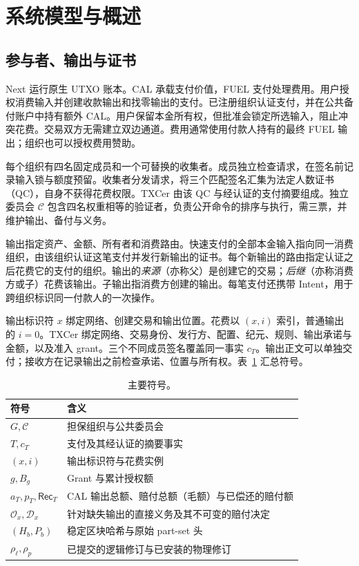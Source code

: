\section{系统模型与概述}
\label{sec:model}

\subsection{参与者、输出与证书}
\label{sec:model-participants}
\label{sec:model-certificates}

Next 运行原生 UTXO 账本。CAL 承载支付价值，FUEL 支付处理费用。用户授权消费输入并创建收款输出和找零输出的支付。已注册组织认证支付，并在公共备付账户中持有额外 CAL。用户保留本金所有权，但批准会锁定所选输入，阻止冲突花费。交易双方无需建立双边通道。费用通常使用付款人持有的最终 FUEL 输出；组织也可以授权费用赞助。

每个组织有四名固定成员和一个可替换的收集者。成员独立检查请求，在签名前记录输入锁与额度预留。收集者分发请求，将三个匹配签名汇集为法定人数证书（QC），自身不获得花费权限。TXCer 由该 QC 与经认证的支付摘要组成。独立委员会 $\mathcal C$ 包含四名权重相等的验证者，负责公开命令的排序与执行，需三票，并维护输出、备付与义务。

输出指定资产、金额、所有者和消费路由。快速支付的全部本金输入指向同一消费组织，由该组织认证这笔支付并发行新输出的证书。每个新输出的路由指定认证之后花费它的支付的组织。输出的\emph{来源}（亦称父）是创建它的交易；\emph{后继}（亦称消费方或子）花费该输出。子输出指消费方创建的输出。每笔支付还携带 Intent，用于跨组织标识同一付款人的一次操作。

输出标识符 $x$ 绑定网络、创建交易和输出位置。花费以 $(x,i)$ 索引，普通输出的 $i=0$。TXCer 绑定网络、交易身份、发行方、配置、纪元、规则、输出承诺与金额，以及准入 grant。三个不同成员签名覆盖同一事实 $c_T$。输出正文可以单独交付；接收方在记录输出之前检查承诺、位置与所有权。表~\ref{tab:model-notation} 汇总符号。

\begin{table}[!b]
\caption{主要符号。}
\label{tab:model-notation}
\centering
\begin{tabular}{@{}p{}p{}@{}}
\toprule
符号 & 含义 \\
\midrule
$G,\mathcal C$ & 担保组织与公共委员会 \\
$T,c_T$ & 支付及其经认证的摘要事实 \\
$(x,i)$ & 输出标识符与花费实例 \\
$g,B_g$ & Grant 与累计授权额 \\
$a_T,p_T,\mathsf{Rec}_T$ & CAL 输出总额、赔付总额（毛额）与已偿还的赔付额 \\
$\mathcal O_x,\mathcal D_x$ & 针对缺失输出的直接义务及其不可变的赔付决定 \\
$(H_b,P_b)$ & 稳定区块哈希与原始 part-set 头 \\
$\rho_\ell,\rho_p$ & 已提交的逻辑修订与已安装的物理修订 \\
\bottomrule
\end{tabular}
\end{table}


